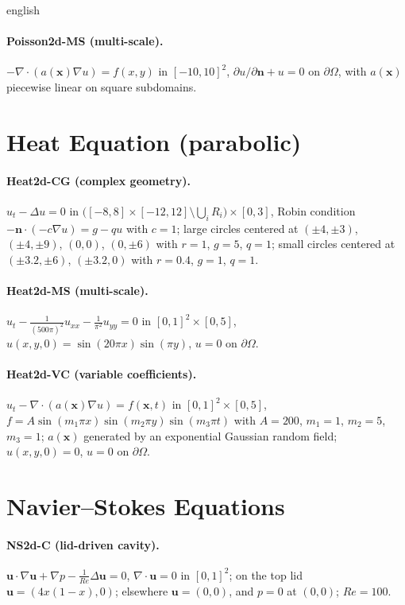 \documentclass[../0000.tex]{subfiles}
\begin{document}
\begin{hyphenrules}{english}
\paragraph{Poisson2d-MS (multi-scale).} $-\nabla\cdot(a(\mathbf{x})\nabla u)=f(x,y)$ in $[-10,10]^2$,
$\partial u/\partial\mathbf{n}+u=0$ on $\partial\Omega$, with $a(\mathbf{x})$ piecewise linear on square subdomains.

\section{Heat Equation (parabolic)}
\paragraph{Heat2d-CG (complex geometry).} $u_t-\Delta u=0$ in
$\big([-8,8]\times[-12,12]\setminus\bigcup_iR_i\big)\times[0,3]$, Robin condition
$-\mathbf{n}\cdot(-c\nabla u)=g-qu$ with $c=1$; large circles centered at $(\pm4,\pm3)$, $(\pm4,\pm9)$, $(0,0)$,
$(0,\pm6)$ with $r=1$, $g=5$, $q=1$; small circles centered at $(\pm3.2,\pm6)$, $(\pm3.2,0)$ with $r=0.4$,
$g=1$, $q=1$.

\paragraph{Heat2d-MS (multi-scale).} $u_t-\frac{1}{(500\pi)^2}u_{xx}-\frac{1}{\pi^2}u_{yy}=0$ in
$[0,1]^2\times[0,5]$, $u(x,y,0)=\sin(20\pi x)\sin(\pi y)$, $u=0$ on $\partial\Omega$.

\paragraph{Heat2d-VC (variable coefficients).} $u_t-\nabla\cdot(a(\mathbf{x})\nabla u)=f(\mathbf{x},t)$ in
$[0,1]^2\times[0,5]$, $f=A\sin(m_1\pi x)\sin(m_2\pi y)\sin(m_3\pi t)$ with $A=200$, $m_1=1$, $m_2=5$,
$m_3=1$; $a(\mathbf{x})$ generated by an exponential Gaussian random field; $u(x,y,0)=0$, $u=0$ on $\partial\Omega$.

\section{Navier--Stokes Equations}
\paragraph{NS2d-C (lid-driven cavity).} $\mathbf{u}\cdot\nabla\mathbf{u}+\nabla p-\frac{1}{Re}\Delta\mathbf{u}=0$,
$\nabla\cdot\mathbf{u}=0$ in $[0,1]^2$; on the top lid $\mathbf{u}=(4x(1-x),0)$; elsewhere $\mathbf{u}=(0,0)$,
and $p=0$ at $(0,0)$; $Re=100$.


\end{hyphenrules}
\end{document}
